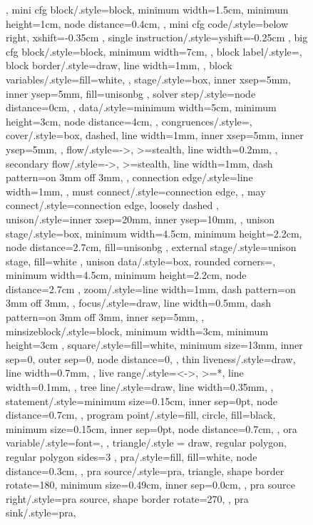 \documentclass[acmsmall,authorversion,nonacm]{acmart}
\begin{document}
\begin{figure}
{{{{  },
  mini cfg block/.style={block,
    minimum width=1.5cm,
    minimum height=1cm,
    node distance=0.4cm,
  },
  mini cfg code/.style={below right,
    xshift=-0.35cm
  },
  single instruction/.style={yshift=-0.25cm
  },
  big cfg block/.style={block,
    minimum width=7cm,
  },
  block label/.style={},
  block border/.style={draw,
    line width=1mm,
  },
  block variables/.style={fill=white,
  },
  stage/.style={box,
    inner xsep=5mm,
    inner ysep=5mm,
    fill=unisonbg
  },
  solver step/.style={node distance=0cm,
  },
  data/.style={minimum width=5cm,
    minimum height=3cm,
    node distance=4cm,
  },
  congruences/.style={},
  cover/.style={box,
    dashed,
    line width=1mm,
    inner xsep=5mm,
    inner ysep=5mm,
  },
  flow/.style={->,
    >=stealth,
    line width=0.2mm,
  },
  secondary flow/.style={->,
    >=stealth,
    line width=1mm,
    dash pattern=on 3mm off 3mm,
  },
  connection edge/.style={line width=1mm,
  },
  must connect/.style={connection edge,
  },
  may connect/.style={connection edge,
    loosely dashed
  },
  unison/.style={inner xsep=20mm,
    inner ysep=10mm,
  },
  unison stage/.style={box,
    minimum width=4.5cm,
    minimum height=2.2cm,
    node distance=2.7cm,
    fill=unisonbg
  },
  external stage/.style={unison stage,
    fill=white
  },
  unison data/.style={box,
    rounded corners=\cornerRadius,
    minimum width=4.5cm,
    minimum height=2.2cm,
    node distance=2.7cm
  },
  zoom/.style={line width=1mm,
    dash pattern=on 3mm off 3mm,
  },
  focus/.style={draw,
    line width=0.5mm,
    dash pattern=on 3mm off 3mm,
    inner sep=5mm,
  },
  minsizeblock/.style={block,
    minimum width=3cm,
    minimum height=3cm
  },
  square/.style={fill=white,
    minimum size=13mm,
    inner sep=0,
    outer sep=0,
    node distance=0,
  },
  thin liveness/.style={draw,
    line width=0.7mm,
  },
  live range/.style={<->,
      >=*,
      line width=0.1mm,
    },
  tree line/.style={draw,
    line width=0.35mm,
  },
  statement/.style={minimum size=0.15cm,
    inner sep=0pt,
    node distance=0.7cm,
  },
  program point/.style={fill,
    circle,
    fill=black,
    minimum size=0.15cm,
    inner sep=0pt,
    node distance=0.7cm,
  },
  ora variable/.style={font=\small,
  },
  triangle/.style = {draw, regular polygon, regular polygon sides=3 },
  pra/.style={fill,
    fill=white,
    node distance=0.3cm,
  },
  pra source/.style={pra,
    triangle,
    shape border rotate=180,
    minimum size=0.49cm,
    inner sep=0.0cm,
  },
  pra source right/.style={pra source,
    shape border rotate=270,
  },
  pra sink/.style={pra,
}}}}
\end{figure}
\end{document}
